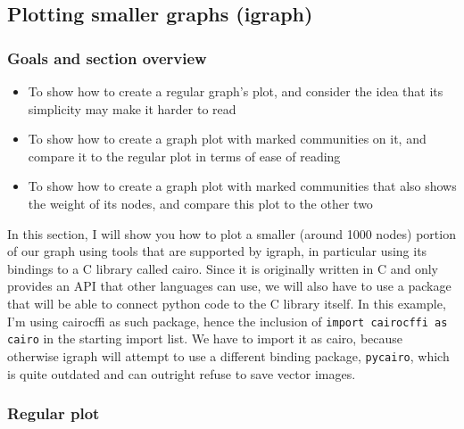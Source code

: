 \documentclass[12pt, a4paper]{article}
\begin{document}
\newpage
\subsection{Plotting smaller graphs (igraph)}
\subsubsection{Goals and section overview}

\begin{itemize}
  \item To show how to create a regular graph's plot, and consider the idea that its simplicity may make it harder to read
  \item To show how to create a graph plot with marked communities on it, and compare it to the regular plot in terms of ease of reading
  \item To show how to create a graph plot with marked communities that also shows the weight of its nodes, and compare this plot to the other two
\end{itemize}


In this section, I will show you how to plot a smaller (around 1000 nodes) portion of our graph using tools that are supported by igraph, in particular using its bindings to a C library called cairo. Since it is originally written in C and only provides an API that other languages can use, we will also have to use a package that will be able to connect python code to the C library itself. In this example, I'm using cairocffi as such package, hence the inclusion of \texttt{import cairocffi as cairo} in the starting import list. We have to import it as cairo, because otherwise igraph will attempt to use a different binding package, \texttt{pycairo}, which is quite outdated and can outright refuse to save vector images.

\subsubsection{Regular plot}
\end{document}
